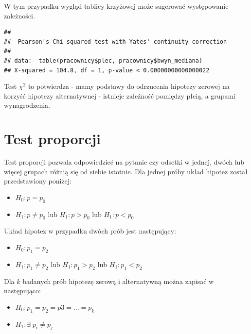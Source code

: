 \documentclass[]{book}
\newenvironment{Shaded}{\begin{snugshade}}{\end{snugshade}}
\newcommand{\KeywordTok}[1]{\textcolor[rgb]{0.13,0.29,0.53}{\textbf{#1}}}
\newcommand{\NormalTok}[1]{#1}
\newcommand{\OperatorTok}[1]{\textcolor[rgb]{0.81,0.36,0.00}{\textbf{#1}}}
\providecommand{\tightlist}{%
  \setlength{\itemsep}{0pt}\setlength{\parskip}{0pt}}
\begin{document}
W tym przypadku wygląd tablicy krzyżowej może sugerować występowanie zależności.

\begin{Shaded}
\end{Shaded}

\begin{verbatim}
## 
##  Pearson's Chi-squared test with Yates' continuity correction
## 
## data:  table(pracownicy$plec, pracownicy$bwyn_mediana)
## X-squared = 104.8, df = 1, p-value < 0.00000000000000022
\end{verbatim}

Test \(\chi^2\) to potwierdza - mamy podstawy do odrzucenia hipotezy zerowej na korzyść hipotezy alternatywnej - istnieje zależność pomiędzy płcią, a grupami wynagrodzenia.

\hypertarget{test-proporcji}{%
\section{Test proporcji}\label{test-proporcji}}

Test proporcji pozwala odpowiedzieć na pytanie czy odsetki w jednej, dwóch lub więcej grupach różnią się od siebie istotnie. Dla jednej próby układ hipotez został przedstawiony poniżej:

\begin{itemize}
\tightlist
\item
  \(H_0: p=p_0\)
\item
  \(H_1: p \neq p_0\) lub \(H_1: p > p_0\) lub \(H_1: p < p_0\)
\end{itemize}

Układ hipotez w przypadku dwóch prób jest następujący:

\begin{itemize}
\tightlist
\item
  \(H_0: p_1=p_2\)
\item
  \(H_1: p_1 \neq p_2\) lub \(H_1: p_1 > p_2\) lub \(H_1: p_1 < p_2\)
\end{itemize}

Dla \(k\) badanych prób hipotezę zerową i alternatywną można zapisać w następująco:

\begin{itemize}
\tightlist
\item
  \(H_0: p_1=p_2=p3=...=p_k\)
\item
  \(H_1: \exists \; p_i \neq p_j\)
\end{itemize}
\end{document}
